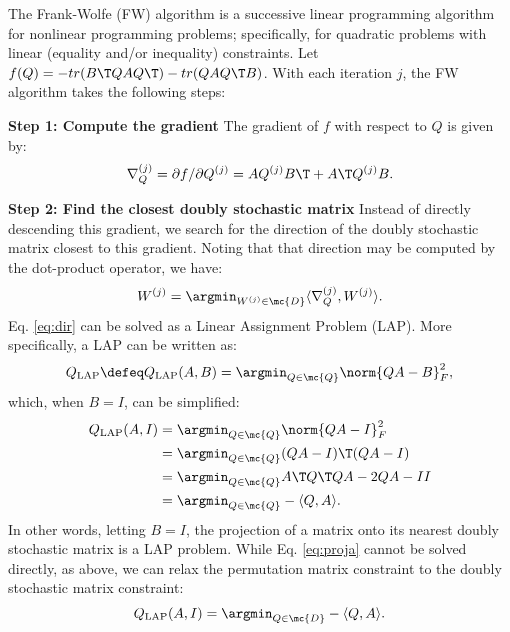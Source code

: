\documentclass[10pt,journal,cspaper,compsoc]{IEEEtran}
\begin{document}
The Frank-Wolfe (FW) algorithm is a successive linear programming algorithm for nonlinear programming problems; specifically, for quadratic problems with linear (equality and/or inequality) constraints. Let $f(Q)=- tr(B\T QAQ\T) - tr(QAQ\T B)$.  With each iteration $j$, the FW algorithm takes the following steps:

\textbf{Step 1: Compute the gradient} The gradient of $f$ with respect to $Q$ is given by:
\begin{align} \label{eq:grad}
	\nabla_Q^{(j)} = \partial f / \partial Q^{(j)} =  A Q^{(j)} B\T + A\T Q^{(j)} B.
\end{align}


\textbf{Step 2: Find the closest doubly stochastic matrix} Instead of directly descending this gradient, we search for the direction of the doubly stochastic matrix closest to this gradient. Noting that that direction may be computed by the dot-product operator, we have:
\begin{align}\label{eq:dir}
	W^{(j)} = \argmin_{W^{(j)} \in \mc{D}} \langle \nabla_Q^{(j)},W^{(j)} \rangle. %
\end{align}
Eq. \eqref{eq:dir} can be solved as a Linear Assignment Problem (LAP).  More specifically, a LAP can be written as:
\begin{align} \label{eq:LAP}
	Q_{\text{LAP}} \defeq Q_{\text{LAP}}(A,B) = \argmin_{Q \in \mc{Q}} \norm{QA - B }^2_F,
\end{align}
which, when $B=I$, can be simplified:
\begin{align} \label{eq:proja}
	Q_{\text{LAP}}(A,I) &=\argmin_{Q \in \mc{Q}} \norm{QA - I}_F^2 
	\nonumber \\ &= \argmin_{Q \in \mc{Q}} (QA-I)\T (QA-I) 
	\nonumber\\ &=\argmin_{Q \in \mc{Q}} A\T Q\T QA -2QA - II 
	\nonumber\\ &= \argmin_{Q \in \mc{Q}}  -\langle Q, A \rangle.  
\end{align}
In other words, letting $B=I$, the projection of a matrix onto its nearest doubly stochastic matrix is a LAP problem.  While Eq. \eqref{eq:proja} cannot be solved directly, as above, we can relax the permutation matrix constraint to the doubly stochastic matrix constraint:
\begin{align}\label{eq:relaxed}
	Q_{\text{LAP}}(A,I) = \argmin_{Q\in\mc{D}} -\langle Q, A \rangle. 
\end{align}
\end{document}
